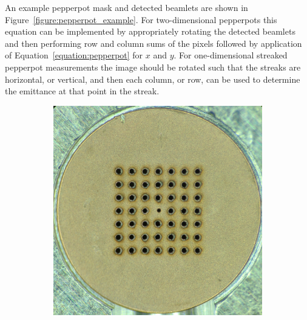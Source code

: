 An example pepperpot mask and detected beamlets are shown in Figure~\ref{figure:pepperpot_example}.
For two-dimensional pepperpots this equation can be implemented by appropriately rotating the detected beamlets and then performing row and column sums of the pixels followed by application of Equation~\ref{equation:pepperpot} for $x$ and $y$.
For one-dimensional streaked pepperpot measurements the image should be rotated such that the streaks are horizontal, or vertical, and then each column, or row, can be used to determine the emittance at that point in the streak.

\begin{figure}
    \centering
    \begin{subfigure}{0.49\linewidth}
    \centering
    \includegraphics[width=\linewidth]{part2/Figs/example_pepperpot_mask.jpg}
    \caption{}
    \label{figure:pepperpot_mask}
    \end{subfigure}
    \begin{subfigure}{0.49\linewidth}
    \centering
    
    \caption{}
    \label{figure:pepperpot_image}
    \end{subfigure}
    

\end{figure}
